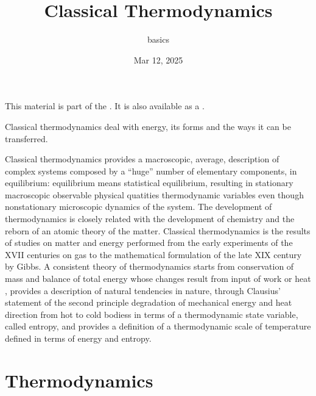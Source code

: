 \documentclass[letterpaper,10pt,english]{jupyterBook}
\title{Classical Thermodynamics}
\date{Mar 12, 2025}
\author{basics}
\begin{document}
\pagestyle{empty}
\sphinxmaketitle
\pagestyle{plain}
\sphinxtableofcontents
\pagestyle{normal}
\label{\detokenize{intro::doc}}


\sphinxAtStartPar
This material is part of the . It is also available as a .

\sphinxAtStartPar
Classical thermodynamics deal with energy, its forms and the ways it can be transferred.

\sphinxAtStartPar
Classical thermodynamics provides a macroscopic, average, description of complex systems composed by a “huge” number of elementary components, in equilibrium: equilibrium means statistical equilibrium, resulting in stationary macroscopic observable physical quatities \sphinxhyphen{} thermodynamic variables \sphinxhyphen{} even though non\sphinxhyphen{}stationary microscopic dynamics of the system. The development of thermodynamics is closely related with the development of chemistry and the re\sphinxhyphen{}born of an atomic theory of the matter. Classical thermodynamics is the results of studies on matter and energy performed from the early experiments of the XVII centuries on gas to the mathematical formulation of the late XIX century by Gibbs. A consistent theory of thermodynamics starts from conservation of mass and balance of total energy \sphinxhyphen{} whose changes result from input of work or heat \sphinxhyphen{}, provides a description of natural tendencies in nature, through Clausius’ statement of the second principle \sphinxhyphen{} degradation of mechanical energy and heat direction from hot to cold bodiess \sphinxhyphen{} in terms of a thermodynamic state variable, called entropy, and provides a definition of a thermodynamic scale of temperature \sphinxhyphen{} defined in terms of energy and entropy.



\sphinxstepscope


\part{Thermodynamics}

\sphinxstepscope
\end{document}
